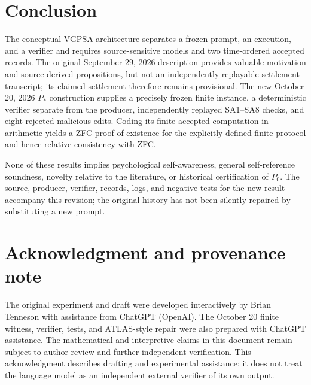 \documentclass[11pt]{article}
\theoremstyle{remark}
\begin{document}
\section{Conclusion}
The conceptual VGPSA architecture separates a frozen prompt, an execution, and a verifier and requires source-sensitive models and two time-ordered accepted records. The original September 29, 2026 description provides valuable motivation and source-derived propositions, but not an independently replayable settlement transcript; its claimed settlement therefore remains provisional. The new October 20, 2026 $P_*$ construction supplies a precisely frozen finite instance, a deterministic verifier separate from the producer, independently replayed SA1--SA8 checks, and eight rejected malicious edits. Coding its finite accepted computation in arithmetic yields a ZFC proof of existence for the explicitly defined finite protocol and hence relative consistency with ZFC.

None of these results implies psychological self-awareness, general self-reference soundness, novelty relative to the literature, or historical certification of $P_0$. The source, producer, verifier, records, logs, and negative tests for the new result accompany this revision; the original history has not been silently repaired by substituting a new prompt.

\section*{Acknowledgment and provenance note}
The original experiment and draft were developed interactively by Brian Tenneson with assistance from ChatGPT (OpenAI). The October 20 finite witness, verifier, tests, and ATLAS-style repair were also prepared with ChatGPT assistance. The mathematical and interpretive claims in this document remain subject to author review and further independent verification. This acknowledgment describes drafting and experimental assistance; it does not treat the language model as an independent external verifier of its own output.
\end{document}
